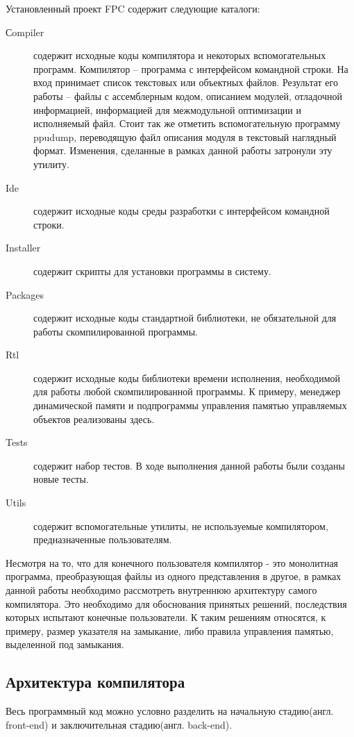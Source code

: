 \documentclass{imcs}
\begin{document}
Установленный проект FPC содержит следующие каталоги:
\begin{description}
  \item[Сompiler] содержит исходные коды компилятора и некоторых 
  вспомогательных программ. Компилятор -- программа с интерфейсом командной строки. На вход
принимает список текстовых или объектных файлов. Результат его работы --
файлы с ассемблерным кодом, описанием модулей, отладочной информацией,
информацией для межмодульной оптимизации и исполняемый файл. Стоит так же отметить
вспомогательную программу ppudump, переводящую файл описания модуля в текстовый наглядный
формат. Изменения, сделанные в рамках данной работы затронули эту утилиту.
    \item[Ide] содержит исходные коды среды разработки с интерфейсом командной строки.
    \item[Installer] содержит скрипты для установки программы в систему.
    \item[Packages] содержит исходные коды стандартной библиотеки, не обязательной для работы скомпилированной программы.
    \item[Rtl] содержит исходные коды библиотеки времени исполнения, необходимой для работы любой скомпилированной программы. К 
примеру, менеджер динамической памяти и подпрограммы управления памятью
управляемых объектов реализованы здесь.
    \item[Tests] содержит набор тестов. В ходе выполнения данной работы были созданы
новые тесты.
    \item[Utils] содержит вспомогательные утилиты, не используемые компилятором,
предназначенные пользователям.
\end{description}

Несмотря на то, что для конечного пользователя компилятор - это монолитная
программа, преобразующая файлы из одного представления в другое, в рамках
данной работы необходимо рассмотреть внутреннюю архитектуру самого компилятора.
Это необходимо для обоснования принятых решений, последствия которых 
испытают конечные пользователи. К таким решениям относятся, к примеру,
размер указателя на замыкание, либо правила управления памятью,
выделенной под замыкания.

\subsection{Архитектура компилятора}

Весь программный код можно условно разделить на начальную стадию(англ. front-end)
и заключительная стадию(англ. back-end)\cite{dragonbook}.
\end{document}
